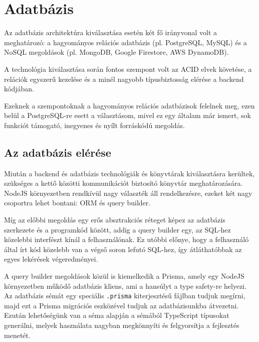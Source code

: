 \section{Adatbázis}
Az adatbázis architektúra kiválasztása esetén két fő irányvonal volt a meghatározó: a hagyományos relációs adatbázis (pl. PostgreSQL, MySQL) és a NoSQL megoldások (pl. MongoDB, Google Firestore, AWS DynamoDB).

A technológia kiválasztása során fontos szempont volt az ACID elvek követése, a relációk egyszerű kezelése és a minél nagyobb típusbiztosság elérése a backend kódjában.

Ezeknek a szempontoknak a hagyományos relációs adatbázisok felelnek meg, ezen belül a PostgreSQL-re esett a választásom, mivel ez egy általam már ismert, sok funkciót támogató, inegyenes és nyílt forráskódú megoldás. \cite{Postgresql}

\subsection{Az adatbázis elérése}
Miután a backend és adatbázis technológiák és könyvtárak kiválasztásra kerültek, szükséges a kettő közötti kommunikációt biztosító könyvtár meghatározására.
NodeJS környezetben rendkívül nagy választék áll rendelkezésre, ezeket két nagy csoportra lehet bontani: ORM és query builder.

Míg az előbbi megoldás egy erős absztrakciós réteget képez az adatbázis szerkezete és a programkód között, addig a query builder egy, az SQL-hez közelebbi interfészt kínál a felhasználónak.
Ez utóbbi előnye, hogy a felhasználó által írt kód közelebb van a végső soron lefutó SQL-hez, így átláthatóbbak az egyes lekérések végeredményei.

A query builder megoldások közül is kiemelkedik a Prisma, amely egy NodeJS környezetben működő adatbázis kliens, ami a hansúlyt a type safety-re helyezi.
Az adatbázis sémát egy speciális \lstinline|.prisma| kiterjesztésű fájlban tudjuk megírni, majd ezt a Prisma migrációs eszközével tudjuk az adatbázisunkba átvezetni.
Ezután lehetőségünk van a séma alapján a sémából TypeScript típusokat generálni, melyek használata nagyban megkönnyíti és felgyorsítja a fejlesztés menetét.

